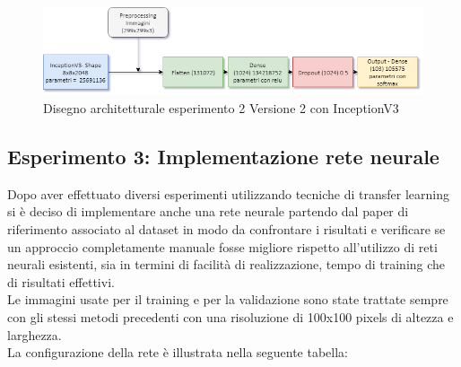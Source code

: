 \begin{figure}
    \centering
    \includegraphics[width=1\textwidth]{./resources/AdvanceMachineLearningSchema-Esperimento2_V2.png}
    \caption{Disegno architetturale esperimento 2 Versione 2 con InceptionV3} 
    \label{fig:architettura-esperimento2_V2}
\end{figure}



\subsection{Esperimento 3: Implementazione rete neurale}

Dopo aver effettuato diversi esperimenti utilizzando tecniche di transfer learning si è deciso di implementare anche una rete neurale partendo dal paper di riferimento associato al dataset \cite{customnet} in modo da confrontare i risultati e verificare se un approccio completamente manuale fosse migliore rispetto all'utilizzo di reti neurali esistenti, sia in termini di facilità di realizzazione, tempo di training che di risultati effettivi. \\
Le immagini usate per il training e per la validazione sono state trattate sempre con gli stessi metodi precedenti con una risoluzione di 100x100 pixels di altezza e larghezza. \\
La configurazione della rete è illustrata nella seguente tabella: \\

